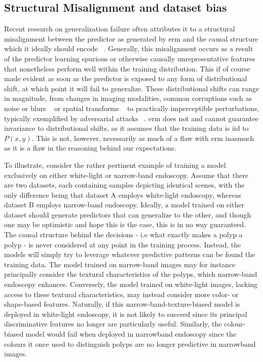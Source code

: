 	\subsection{Structural Misalignment and dataset bias}
	Recent research on generalization failure often attributes it to a structural misalignment between the predictor as generated by \gls{erm} and the causal structure which it ideally should encode ~\cite{adversarial_bugs_features,shortcut_learning,IRM, causality}. Generally, this misalignment occurs as a result of the predictor learning spurious or otherwise causally unrepresentative features that nonetheless perform well within the training distribution. This if of course made evident as soon as the predictor is exposed to any form of distributional shift, at which point it will fail to generalize. These distributional shifts can range in magnitude, from changes in imaging modalities, common corruptions such as noise or blurs ~\cite{benchmarking_robustness} or spatial transforms ~\cite{spatial_robustness} to practically imperceptible perturbations, typically exemplified by adversarial attacks ~\cite{adversarial_attacks}. \gls{erm} does not and cannot guarantee invariance to distributional shifts, as it assumes that the training data is \gls{iid} to \(P(x,y)\). This is not, however, necessarily as much of a flaw with \gls{erm} inasmuch as it is a flaw in the reasoning behind our expectations. 
		
	To illustrate, consider the rather pertinent example of training a model exclusively on either white-light or narrow-band endoscopy. Assume that there are two datasets, each containing samples depicting identical scenes, with the only difference being that dataset A employs white-light endoscopy, whereas dataset B employs narrow-band endoscopy. Ideally, a model trained on either dataset should generate predictors that can generalize to the other, and though one may be optimistic and hope this is the case, this is in no way guaranteed. The causal structure behind the decisions - i.e what exactly makes a polyp a polyp - is never considered at any point in the training process. Instead, the models will simply try to leverage whatever predictive patterns can be found the training data. The model trained on narrow-band images may for instance principally consider the textural characteristics of the polyps, which narrow-band endoscopy enhances. Conversely, the model trained on white-light images, lacking access to these textural characteristics, may instead consider more color- or shape-based features. Naturally, if this narrow-band-texture-biased model is deployed in white-light endoscopy, it is not likely to succeed since its principal discriminative features no longer are particularly useful. Similarly, the colour-biased model would fail when deployed in narrowband endoscopy since the colours it once used to distinguish polyps are no longer predictive in narrowband images.  

